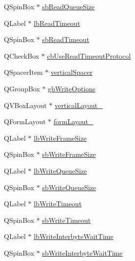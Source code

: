 \begin{DoxyCompactItemize}
\item 
Q\-Spin\-Box $\ast$ \hyperlink{class_ui__mdt_port_config_widget_ae685d5d2ed082b55c0dab1be72a5cf7c}{sb\-Read\-Queue\-Size}
\item 
Q\-Label $\ast$ \hyperlink{class_ui__mdt_port_config_widget_a1d94349dd589b249856daf4f728dedd0}{lb\-Read\-Timeout}
\item 
Q\-Spin\-Box $\ast$ \hyperlink{class_ui__mdt_port_config_widget_a108c450db9637fec5627512417954f67}{sb\-Read\-Timeout}
\item 
Q\-Check\-Box $\ast$ \hyperlink{class_ui__mdt_port_config_widget_a691a9c141b534354e9bae4015da092de}{cb\-Use\-Read\-Timeout\-Protocol}
\item 
Q\-Spacer\-Item $\ast$ \hyperlink{class_ui__mdt_port_config_widget_aeb8f037334c9939ddc6b8efb716ec07e}{vertical\-Spacer}
\item 
Q\-Group\-Box $\ast$ \hyperlink{class_ui__mdt_port_config_widget_addba4da32474b69228ea901c798c9141}{gb\-Write\-Options}
\item 
Q\-V\-Box\-Layout $\ast$ \hyperlink{class_ui__mdt_port_config_widget_a8a06f16033c31f1bb40d1b6abe4cbba9}{vertical\-Layout\-\_}
\item 
Q\-Form\-Layout $\ast$ \hyperlink{class_ui__mdt_port_config_widget_a725fa4f3de7a04873c6f1d8b40757dd7}{form\-Layout\-\_}
\item 
Q\-Label $\ast$ \hyperlink{class_ui__mdt_port_config_widget_a1d6c9086b1b1546c87df1fbaa3d68470}{lb\-Write\-Frame\-Size}
\item 
Q\-Spin\-Box $\ast$ \hyperlink{class_ui__mdt_port_config_widget_a52ec537c07730bc8bb402789ccb51774}{sb\-Write\-Frame\-Size}
\item 
Q\-Label $\ast$ \hyperlink{class_ui__mdt_port_config_widget_a7f57346f1e11a863d0b77664edf6a671}{lb\-Write\-Queue\-Size}
\item 
Q\-Spin\-Box $\ast$ \hyperlink{class_ui__mdt_port_config_widget_ab5ded09564d59f57338a99642c8ad739}{sb\-Write\-Queue\-Size}
\item 
Q\-Label $\ast$ \hyperlink{class_ui__mdt_port_config_widget_aa0a486c1023d9f7d4e133ae86a826cc7}{lb\-Write\-Timeout}
\item 
Q\-Spin\-Box $\ast$ \hyperlink{class_ui__mdt_port_config_widget_a146b41c99efbf3042b3eda59b18d3fe8}{sb\-Write\-Timeout}
\item 
Q\-Label $\ast$ \hyperlink{class_ui__mdt_port_config_widget_a2610576598438c3dea06dc98746afb12}{lb\-Write\-Interbyte\-Wait\-Time}
\item 
Q\-Spin\-Box $\ast$ \hyperlink{class_ui__mdt_port_config_widget_af238980e5cedecd8f8c80f75a99f8aab}{sb\-Write\-Interbyte\-Wait\-Time}

\end{DoxyCompactItemize}
